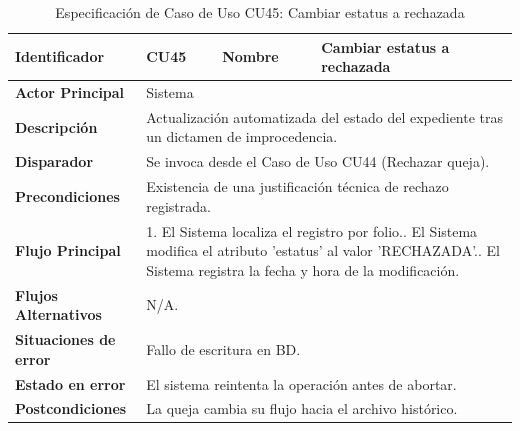 \begingroup
\setlength{\parskip}{0pt}
\begin{longtable}{|p{3.5cm}|p{2cm}|p{2.5cm}|p{7cm}|}
\caption{Especificación de Caso de Uso CU45: Cambiar estatus a rechazada}
\label{tab:cu45} \\
\hline
\textbf{Identificador} & CU45 & \textbf{Nombre} & Cambiar estatus a rechazada \\ \hline
\textbf{Actor Principal} & \multicolumn{3}{p{11.5cm}|}{Sistema} \\ \hline
\textbf{Descripción} & \multicolumn{3}{p{11.5cm}|}{Actualización automatizada del estado del expediente tras un dictamen de improcedencia.} \\ \hline
\textbf{Disparador} & \multicolumn{3}{p{11.5cm}|}{Se invoca desde el Caso de Uso CU44 (Rechazar queja).} \\ \hline
\textbf{Precondiciones} & \multicolumn{3}{p{11.5cm}|}{Existencia de una justificación técnica de rechazo registrada.} \\ \hline
\textbf{Flujo Principal} & \multicolumn{3}{p{11.5cm}|}{1. El Sistema localiza el registro por folio.\newline 2. El Sistema modifica el atributo 'estatus' al valor 'RECHAZADA'.\newline 3. El Sistema registra la fecha y hora de la modificación.} \\ \hline
\textbf{Flujos Alternativos} & \multicolumn{3}{p{11.5cm}|}{N/A.} \\ \hline
\textbf{Situaciones de error} & \multicolumn{3}{p{11.5cm}|}{Fallo de escritura en BD.} \\ \hline
\textbf{Estado en error} & \multicolumn{3}{p{11.5cm}|}{El sistema reintenta la operación antes de abortar.} \\ \hline
\textbf{Postcondiciones} & \multicolumn{3}{p{11.5cm}|}{La queja cambia su flujo hacia el archivo histórico.} \\ \hline
\end{longtable}
\endgroup

\vspace{0.8cm}


